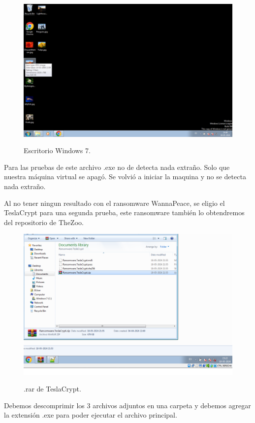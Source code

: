 \documentclass[stu, 11pt, letterpaper, donotrepeattitle, floatsintext, natbib]{apa7}
\begin{document}
\begin{figure}[H]
    \centering
    \caption{Escritorio Windows 7.}
    \includegraphics[width=0.75\linewidth]{ram4.png} %
    \label{fig:OverallEffect}
\end{figure}

Para las pruebas de este archivo .exe no de detecta nada extraño. Solo que nuestra máquina virtual se apagó.  Se volvió a iniciar la maquina y no se detecta nada extraño.

Al no tener ningun resultado con el ransomware WannaPeace, se eligio el TeslaCrypt para una segunda prueba, este ransomware también lo obtendremos del repositorio de TheZoo.

\begin{figure}[H]
    \centering
    \caption{.rar de TeslaCrypt.}
    \includegraphics[width=0.75\linewidth]{ram5.png} %
    \label{fig:OverallEffect}
\end{figure}

Debemos descomprimir los 3 archivos adjuntos en una carpeta y debemos agregar la extensión .exe para poder ejecutar el archivo principal.
\end{document}
